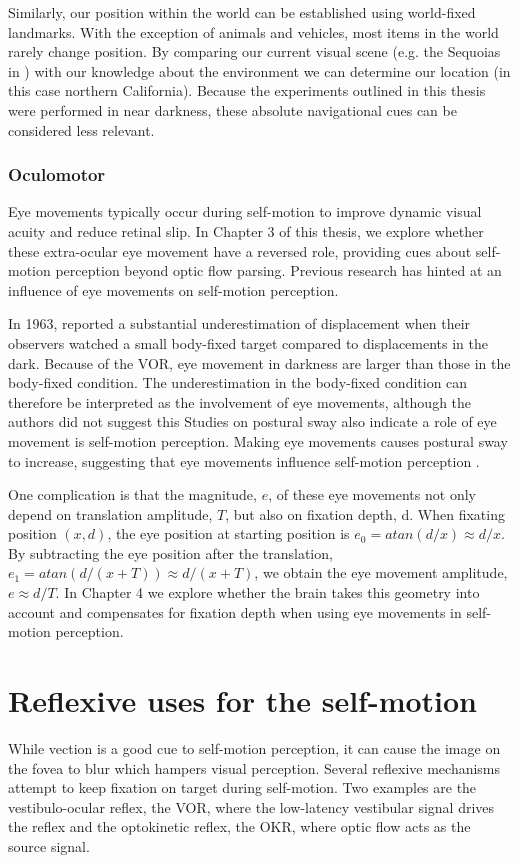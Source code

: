Similarly, our position within the world can be established using world-fixed landmarks. With the exception of animals and vehicles, most items in the world rarely change position. By comparing our current visual scene (e.g. the Sequoias in ) with our knowledge about the environment we can determine our location (in this case northern California). Because the experiments outlined in this thesis were performed in near darkness, these absolute navigational cues can be considered less relevant. 


\subsubsection{Oculomotor}
Eye movements typically occur during self-motion to improve dynamic visual acuity and reduce retinal slip. In Chapter 3 of this thesis, we explore whether these extra-ocular eye movement have a reversed role, providing cues about self-motion perception beyond optic flow parsing. Previous research has hinted at an influence of eye movements on self-motion perception.

In 1963, \citeauthor{guedry1963} reported a substantial underestimation of displacement when their observers watched a small body-fixed target compared to displacements in the dark. Because of the VOR, eye movement in darkness are larger than those in the body-fixed condition. The underestimation in the body-fixed condition can therefore be interpreted as the involvement of eye movements, although the authors did not suggest this 
Studies on postural sway also indicate a role of eye movement is self-motion perception. Making eye movements causes postural sway to increase, suggesting that eye movements influence self-motion perception \cite{glasauer2005,rogrigues2015}.

One complication is that the magnitude, $e$, of these eye movements not only depend on translation amplitude, $T$, but also on fixation depth, d. When fixating position $(x, d)$, the eye position at starting position is $e_0 = atan⁡(d/x) \approx d/x$. By subtracting the eye position after the translation, $e_1 = atan⁡(d/(x+T)) \approx d/(x+T)$, we obtain the eye movement amplitude, $e \approx d/T$. In Chapter 4 we explore whether the brain takes this geometry into account and compensates for fixation depth when using eye movements in self-motion perception.


\section{Reflexive uses for the self-motion}
While vection is a good cue to self-motion perception, it can cause the image on the fovea to blur which hampers visual perception. Several reflexive mechanisms attempt to keep fixation on target during self-motion. Two examples are the vestibulo-ocular reflex, the VOR, where the low-latency vestibular signal drives the reflex and the optokinetic reflex, the OKR, where optic flow acts as the source signal.

